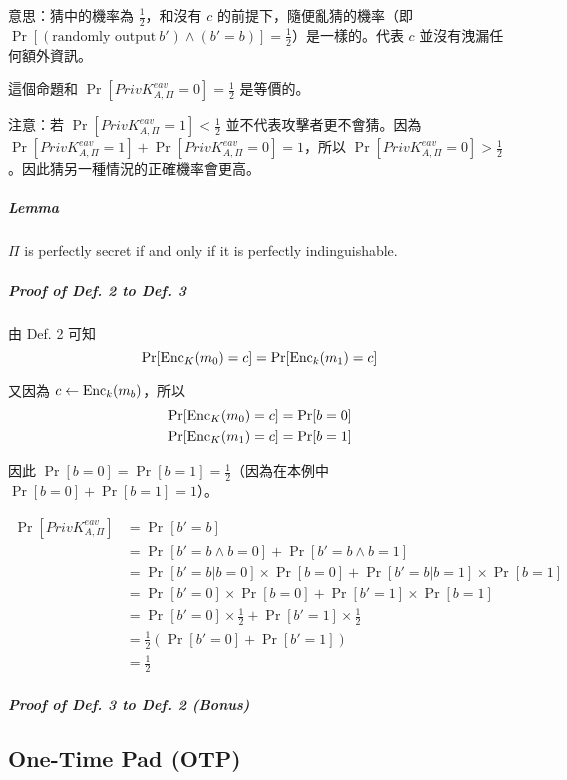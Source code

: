 意思：猜中的機率為 \(\frac{1}{2}\)，和沒有 \(c\) 的前提下，隨便亂猜的機率（即 \(\Pr[(\text{randomly output} \ b' ) \wedge (b' = b)] = \frac{1}{2}\)）是一樣的。代表 \(c\) 並沒有洩漏任何額外資訊。

這個命題和 \(\Pr[PrivK_{A, \Pi}^{eav} = 0] = \frac{1}{2}\) 是等價的。

注意：若 \(\Pr[PrivK_{A, \Pi}^{eav} = 1] < \frac{1}{2}\) 並不代表攻擊者更不會猜。因為 \(\Pr[PrivK_{A, \Pi}^{eav} = 1] + \Pr[PrivK_{A, \Pi}^{eav} = 0] = 1\)，所以 \(\Pr[PrivK_{A, \Pi}^{eav} = 0] > \frac{1}{2}\)。因此猜另一種情況的正確機率會更高。

\subparagraph{Lemma}

\(\Pi\) is perfectly secret if and only if it is perfectly indinguishable.

\subparagraph{Proof of Def. 2 to Def. 3}

由 Def. 2 可知
\[
	\Pr[\operatorname{Enc}_K(m_0) = c] = \Pr[\operatorname{Enc}_k(m_1) = c]
\]

又因為 \(c \leftarrow \operatorname{Enc}_k(m_b)\)，所以
\begin{align*}
	\Pr[\operatorname{Enc}_K(m_0) = c] = \Pr[b = 0] \\
	\Pr[\operatorname{Enc}_K(m_1) = c] = \Pr[b = 1]
\end{align*}

因此 \(\Pr[b = 0] = \Pr[b = 1] = \displaystyle\frac{1}{2}\)（因為在本例中 \(\Pr[b = 0] + \Pr[b = 1] = 1\)）。

\begin{align*}
	\Pr[PrivK_{A, \Pi}^{eav}] &= \Pr[b' = b] \\
	&= \Pr[b' = b \wedge b = 0] + \Pr[b' = b \wedge b = 1] \tag{rewrite} \\
	&= \Pr[b' = b | b = 0] \times \Pr[b = 0] + \Pr[b' = b | b = 1] \times \Pr[b = 1] \tag{rewrite} \\
	&= \Pr[b' = 0]  \times \Pr[b = 0] + \Pr[b' = 1] \times \Pr[b = 1] \\
	&= \Pr[b' = 0]  \times \frac{1}{2} + \Pr[b' = 1] \times \frac{1}{2} \tag{by Def. 2 denoted above} \\
	&= \frac{1}{2}(\Pr[b' = 0] + \Pr[b' = 1]) \\
	&= \frac{1}{2}	\tag{\(\because \Pr[b' = 0] + \Pr[b' = 1] = 1\)}
\end{align*}

\subparagraph{Proof of Def. 3 to Def. 2 (Bonus)}



\subsection{One-Time Pad (OTP)}

